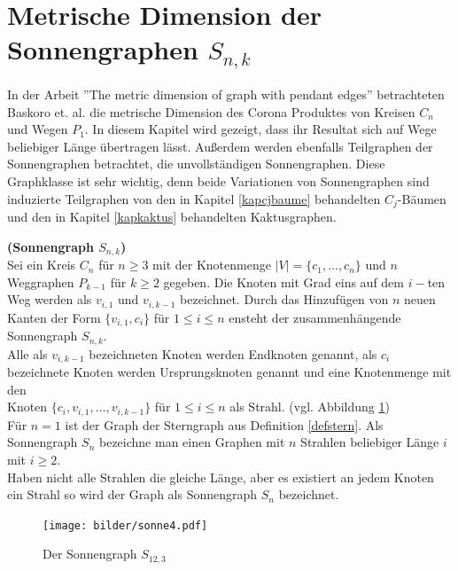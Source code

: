 \section{Metrische Dimension der Sonnengraphen $S_{n,k}$}
\label{chap_sonne}
In der Arbeit ''The metric dimension of graph with pendant edges'' \cite{sun} betrachteten Baskoro et. al. die metrische Dimension des Corona Produktes von Kreisen $C_n$ und Wegen $P_1$. In diesem Kapitel wird gezeigt, dass ihr Resultat sich auf Wege beliebiger Länge übertragen lässt. Außerdem werden ebenfalls Teilgraphen der Sonnengraphen betrachtet, die unvollständigen Sonnengraphen. Diese Graphklasse ist sehr wichtig, denn beide Variationen von Sonnengraphen sind induzierte Teilgraphen von den in Kapitel \ref{kapcjbaume} behandelten $C_j$-Bäumen und den in Kapitel \ref{kapkaktus} behandelten Kaktusgraphen.
\begin{defi}{\textbf{(Sonnengraph $S_{n,k}$)}}\\
Sei ein Kreis $C_n$ für $n \geq 3$ mit der Knotenmenge $|V|=\{ c_1, \ldots , c_n \}$ und $n$ Weggraphen $P_{k-1}$ für $k \geq 2$ gegeben. Die Knoten mit Grad eins auf dem $i-$ten Weg werden als $v_{i,1}$ und $v_{i,k-1}$ bezeichnet. Durch das Hinzufügen von $n$ neuen Kanten der Form $\{v_{i,1},c_i\}$ für $1 \leq i \leq n$ ensteht der zusammenhängende Sonnengraph $S_{n,k}$.\\
Alle als $v_{i,k-1}$ bezeichneten Knoten werden Endknoten genannt, als $c_i$ bezeichnete Knoten werden Ursprungsknoten genannt und eine Knotenmenge mit den\\Knoten $\{c_i,v_{i,1}, \ldots ,v_{i,k-1}\}$ für $1 \leq i \leq n$ als Strahl. (vgl. Abbildung \ref{bild:sonnengraph})\\
Für $n=1$ ist der Graph der Sterngraph aus Definition \ref{defstern}. Als Sonnengraph $S_n$ bezeichne man einen Graphen mit $n$ Strahlen beliebiger Länge $i$ mit $i \geq 2$.\\
Haben nicht alle Strahlen die gleiche Länge, aber es existiert an jedem Knoten ein Strahl so wird der Graph als Sonnengraph $S_n$ bezeichnet.
\end{defi}
\begin{figure}[h!]
\centering
 		 \texttt{[image: bilder/sonne4.pdf]}
   \caption{Der Sonnengraph $S_{12,3}$}
   \label{bild:sonnengraph}
\end{figure}

